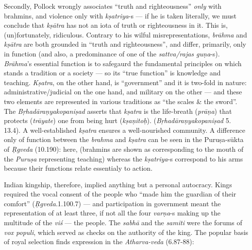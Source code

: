 Secondly, Pollock wrongly associates “truth and righteousness” {\sl only} with brahmins, and violence only with {\sl kṣatriya}-s --- if he is taken literally, we must conclude that {\sl kṣātra} has not an iota of truth or righteousness in it. This is, (un)fortunately, ridiculous. Contrary to his wilful misrepresentations, {\sl brāhma} and {\sl kṣātra} are both grounded in “truth and righteousness”, and differ, primarily, only in function (and also, a predominance of one of the {\sl sattva/rajas guṇa}-s). {\sl Brāhma}’s essential function is to safegaurd the fundamental principles on which stands a tradition or a society --- so its “true function” is knowledge and teaching. {\sl Kṣatra}, on the other hand, is “government” and it is two-fold in nature: administrative/judicial on the one hand, and military on the other --- and these two elements are represented in various traditions as “the scales \& the sword”. The {\sl Bṛhadāraṇyakopaniṣad} asserts that {\sl kṣatra} is the life-breath ({\sl prāṇa}) that protects ({\sl trāyate}) one from being hurt ({\sl kṣaṇitoḥ}). ({\sl Bṛhadāraṇyakopaniṣad} 5. 13.4).  A well-established {\sl kṣatra} ensures a well-nourished community. A difference only of function between the {\sl brahma} and {\sl kṣatra} can be seen in the Puruṣa-sūkta of {\sl Ṛgveda} (10.190): here, (brahmins are shown as corresponding to the mouth of the {\sl Puruṣa} representing teaching) whereas the {\sl kṣatriya}-s correspond to his arms because their functions relate essentialy to action. 

Indian kingship, therefore, implied anything but a personal autocracy. Kings required the vocal consent of the people who “made him the guardian of their comfort” ({\sl Ṛgveda}.1.100.7) --- and participation in government meant the representation of at least three, if not all the four {\sl varṇa}-s making up the multitude of the {\sl viś} --- the people. The {\sl sabhā} and the {\sl samiti} were the forums of {\sl vox populi}, which served as checks on the authority of the king. The popular basis of royal selection finds expression in the {\sl Atharva-veda} (6.87-88):

